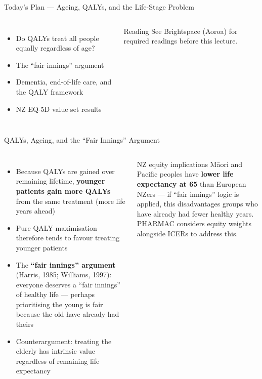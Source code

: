 \documentclass[aspectratio=169, 12pt]{beamer}
\newcommand{\planslide}[2]{%
  \begin{frame}{Today's Plan — #1}
    \begin{columns}
      \column{0.6\textwidth}
      \begin{itemize}#2\end{itemize}
      \column{0.38\textwidth}
      \begin{alertblock}{Reading}
        \footnotesize See Brightspace (Aoroa) for required readings before this lecture.
      \end{alertblock}
    \end{columns}
  \end{frame}}
\begin{document}
\planslide{Ageing, QALYs, and the Life-Stage Problem}{
  \item Do QALYs treat all people equally regardless of age?
  \item The ``fair innings'' argument
  \item Dementia, end-of-life care, and the QALY framework
  \item NZ EQ-5D value set results
}

\begin{frame}{QALYs, Ageing, and the ``Fair Innings'' Argument}
  \begin{columns}
      \begin{itemize}
        \item Because QALYs are gained over remaining lifetime, \textbf{younger patients
              gain more QALYs} from the same treatment (more life years ahead)
        \item Pure QALY maximisation therefore tends to favour treating younger patients
        \item The \textbf{``fair innings'' argument} (Harris, 1985; Williams, 1997): everyone
              deserves a ``fair innings'' of healthy life --- perhaps prioritising the young is
              fair because the old have already had theirs
        \item Counterargument: treating the elderly has intrinsic value regardless of remaining
              life expectancy
      \end{itemize}
      \begin{alertblock}{NZ equity implications}
        Māori and Pacific peoples have \textbf{lower life expectancy at 65} than European NZers
        --- if ``fair innings'' logic is applied, this disadvantages groups who have already had
        fewer healthy years.\\[0.3em]
        PHARMAC considers equity weights alongside ICERs to address this.
      \end{alertblock}
  \end{columns}
\end{frame}
\end{document}
